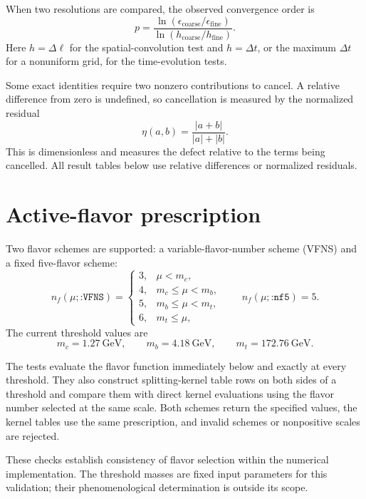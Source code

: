 \documentclass[11pt]{article}
\begin{document}
When two resolutions are compared, the observed convergence order is
\begin{equation}
  p=
  \frac{\ln(\epsilon_{\mathrm{coarse}}/\epsilon_{\mathrm{fine}})}
       {\ln(h_{\mathrm{coarse}}/h_{\mathrm{fine}})}.
  \label{eq:observed-order}
\end{equation}
Here \(h=\Delta\ell\) for the spatial-convolution test and \(h=\Delta t\), or
the maximum \(\Delta t\) for a nonuniform grid, for the time-evolution tests.

Some exact identities require two nonzero contributions to cancel. A
relative difference from zero is undefined, so cancellation is measured by
the normalized residual
\begin{equation}
  \eta(a,b)=\frac{|a+b|}{|a|+|b|}.
  \label{eq:normalized-residual}
\end{equation}
This is dimensionless and measures the defect relative to the terms being
cancelled. All result tables below use relative differences or normalized
residuals.

\section{Active-flavor prescription}

Two flavor schemes are supported: a variable-flavor-number scheme (VFNS) and
a fixed five-flavor scheme:
\begin{equation}
n_f(\mu;\texttt{:VFNS})=
\begin{cases}
3,&\mu<m_c,\\
4,&m_c\le\mu<m_b,\\
5,&m_b\le\mu<m_t,\\
6,&m_t\le\mu,
\end{cases}
\qquad
n_f(\mu;\texttt{:nf5})=5.
\label{eq:nf-schemes}
\end{equation}
The current threshold values are
\[
  m_c=1.27~\mathrm{GeV},\qquad
  m_b=4.18~\mathrm{GeV},\qquad
  m_t=172.76~\mathrm{GeV}.
\]

The tests evaluate the flavor function immediately below and exactly at every
threshold. They also construct splitting-kernel table rows on both sides of a
threshold and compare them with direct kernel evaluations using the flavor
number selected at the same scale. Both schemes return the specified values,
the kernel tables use the same prescription, and invalid schemes or
nonpositive scales are rejected.

These checks establish consistency of flavor selection within the numerical
implementation. The threshold masses are fixed input parameters for this
validation; their phenomenological determination is outside its scope.
\end{document}

